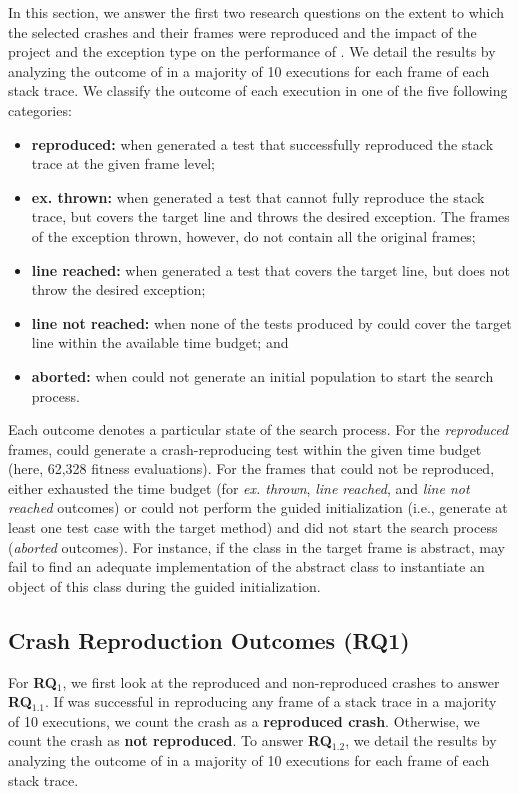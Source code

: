 
In this section, we answer the first two research questions on the extent to which the selected crashes and their frames were reproduced and the impact of the project and the exception type on the performance of \evocrash.
%
We detail the results by analyzing the outcome of \evocrash  in a majority of 10 executions for each frame of each stack trace. We classify the outcome of each execution in one of the five following categories:
\begin{itemize}
\item[] \textbf{reproduced:} when \evocrash generated a test that successfully reproduced the stack trace at the given frame level; 
\item[]\textbf{ex. thrown:} when \evocrash generated a test that cannot fully reproduce the stack trace, but covers the target line and throws the desired exception. The frames of the exception thrown, however, do not contain all the original frames;
\item[]\textbf{line reached:} when  \evocrash generated a test that covers the target line, but does not throw the desired exception;
\item[]\textbf{line not reached:} when none of the tests produced by \evocrash could cover the target line within the available time budget;
and \item[]\textbf{aborted:} when \evocrash could not generate an initial population to start the search process.
\end{itemize}
%
Each outcome denotes a particular state of the search process. For the \emph{reproduced} frames, \evocrash could generate a crash-reproducing test within the given time budget (here, 62,328 fitness evaluations). For the frames that could not be reproduced, either \evocrash exhausted the time budget (for \emph{ex. thrown}, \emph{line reached}, and \emph{line not reached} outcomes) or could not perform the guided initialization (i.e., generate at least one test case with the target method) and did not start the search process (\emph{aborted} outcomes). 
For instance, if the class in the target frame is abstract, \evocrash may fail to find an adequate implementation of the abstract class to instantiate an object of this class during the guided initialization.

\subsection{Crash Reproduction Outcomes (RQ1)}

For \textbf{RQ$_1$},  we first look at the reproduced and non-reproduced crashes to answer \textbf{RQ$_{1.1}$}. 
If \evocrash was successful in reproducing any frame of a stack trace in a majority of 10 executions, we count the crash as a \textbf{reproduced crash}. Otherwise, we count the crash as \textbf{not reproduced}.
%
To answer \textbf{RQ$_{1.2}$}, we detail the results by analyzing the outcome of \evocrash  in a majority of 10 executions for each frame of each stack trace. 

